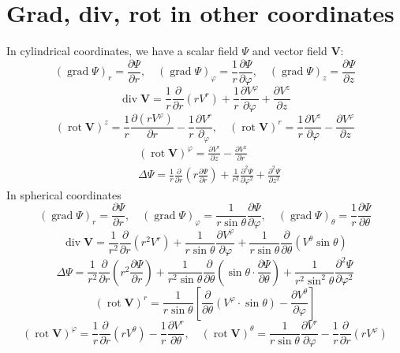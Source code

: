 \section{Grad, div, rot in other coordinates}
In cylindrical coordinates, we have a scalar field $\Psi$ and vector field $\mathbf{V}$:
$$
(\operatorname{grad} \Psi)_{r}=\frac{\partial \Psi}{\partial r}, \quad(\operatorname{grad} \Psi)_{\varphi}=\frac{1}{r} \frac{\partial \Psi}{\partial \varphi}, \quad(\operatorname{grad} \Psi)_{z}=\frac{\partial \Psi}{\partial z}
$$
$$
\operatorname{div} \mathbf{V}=\frac{1}{r} \frac{\partial}{\partial r}\left(r V^{r}\right)+\frac{1}{r} \frac{\partial V^{\varphi}}{\partial \varphi}+\frac{\partial V^{z}}{\partial z}
$$
$$
(\operatorname{rot} \mathbf{V})^{z}=\frac{1}{r} \frac{\partial\left(r V^{\varphi}\right)}{\partial r}-\frac{1}{r} \frac{\partial V^{r}}{\partial_{\varphi}}, \quad(\operatorname{rot} \mathbf{V})^{r}=\frac{1}{r} \frac{\partial V^{z}}{\partial \varphi}-\frac{\partial V^{\varphi}}{\partial z}
$$
$$
\begin{aligned}
&(\operatorname{rot} \mathbf{V})^{\varphi}=\frac{\partial V^{r}}{\partial z}-\frac{\partial V^{z}}{\partial r}\\
&\Delta \Psi=\frac{1}{r} \frac{\partial}{\partial r}\left(r \frac{\partial \Psi}{\partial r}\right)+\frac{1}{r^{2}} \frac{\partial^{2} \Psi}{\partial \varphi^{2}}+\frac{\partial^{2} \Psi}{\partial z^{2}}
\end{aligned}
$$
In spherical coordinates
$$
(\operatorname{grad} \Psi)_{r}=\frac{\partial \Psi}{\partial r}, \quad(\operatorname{grad} \Psi)_{\varphi}=\frac{1}{r \sin \theta} \frac{\partial \Psi}{\partial \varphi}, \quad(\operatorname{grad} \Psi)_{\theta}=\frac{1}{r} \frac{\partial \Psi}{\partial \theta}
$$
$$
\operatorname{div} \mathbf{V}=\frac{1}{r^{2}} \frac{\partial}{\partial r}\left(r^{2} V^{r}\right)+\frac{1}{r \sin \theta} \frac{\partial V^{\varphi}}{\partial \varphi}+\frac{1}{r \sin \theta} \frac{\partial}{\partial \theta}\left(V^{\theta} \sin \theta\right)
$$
$$
\Delta \Psi=\frac{1}{r^{2}} \frac{\partial}{\partial r}\left(r^{2} \frac{\partial \Psi}{\partial r}\right)+\frac{1}{r^{2} \sin \theta} \frac{\partial}{\partial \theta}\left(\sin \theta \cdot \frac{\partial \Psi}{\partial \theta}\right)+\frac{1}{r^{2} \sin ^{2} \theta} \frac{\partial^{2} \Psi}{\partial \varphi^{2}}
$$
$$
(\operatorname{rot} \mathbf{V})^{r}=\frac{1}{r \sin \theta}\left[\frac{\partial}{\partial \theta}\left(V^{\varphi} \cdot \sin \theta\right)-\frac{\partial V^{\theta}}{\partial \varphi}\right]
$$
$$
(\operatorname{rot} \mathbf{V})^{\varphi}=\frac{1}{r} \frac{\partial}{\partial r}\left(r V^{\theta}\right)-\frac{1}{r} \frac{\partial V^{r}}{\partial \theta}, \quad(\operatorname{rot} \mathbf{V})^{\theta}=\frac{1}{r \sin \theta} \frac{\partial V^{r}}{\partial \varphi}-\frac{1}{r} \frac{\partial}{\partial r}\left(r V^{\varphi}\right)
$$

